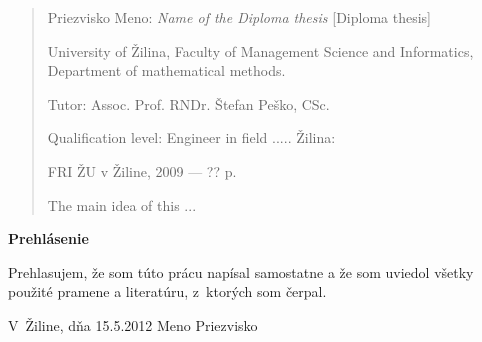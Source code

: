 

\begin{abstract}

\noindent
{\sc Priezvisko Meno:} {\em Name of the Diploma thesis}
[Diploma thesis] 

\noindent
University of Žilina,  
Faculty of Management Science and Informatics, 
Department of mathematical methods.
 
\noindent
Tutor:  Assoc. Prof. RNDr. Štefan Peško, CSc. 
 
\noindent
Qualification level:
Engineer in field ..... Žilina: 

\noindent
FRI ŽU v Žiline, 2009 --- ?? p.

\bigskip

The main idea of this ...

\end{abstract}


\newpage

\centerline{\bf Prehlásenie}

\vspace{2em}

\noindent
Prehlasujem, že som túto prácu napísal samostatne a že som uviedol 
všetky použité pramene a literatúru, z~ktorých som čerpal. 

\vspace{2em}

\noindent
V~Žiline, dňa 15.5.2012
\hfill
Meno Priezvisko

